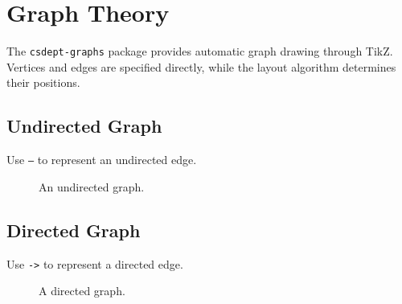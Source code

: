 \documentclass{csdept}
\begin{document}
\section{Graph Theory}

The \texttt{csdept-graphs} package provides automatic graph
drawing through TikZ. Vertices and edges are specified directly,
while the layout algorithm determines their positions.

\subsection{Undirected Graph}

Use \texttt{--} to represent an undirected edge.

\begin{figure}[htbp]
    \centering


    \caption{An undirected graph.}
    \label{fig:undirected-graph}
\end{figure}

\subsection{Directed Graph}

Use \texttt{->} to represent a directed edge.

\begin{figure}[htbp]
    \centering


    \caption{A directed graph.}
    \label{fig:directed-graph}
\end{figure}
\end{document}
